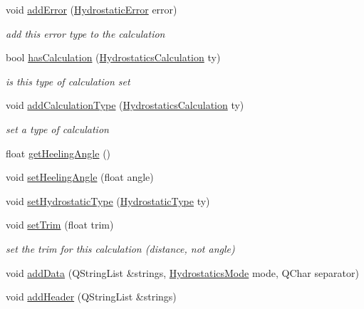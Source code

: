 \begin{DoxyCompactItemize}
void \hyperlink{classShipCAD_1_1HydrostaticCalc_a7c42f2e85cca01401ece2684903b7fbd}{add\-Error} (\hyperlink{namespaceShipCAD_a48b5202490cd6d86939d57c867837c0f}{Hydrostatic\-Error} error)
\begin{DoxyCompactList}\small\item\em add this error type to the calculation \end{DoxyCompactList}\item 
bool \hyperlink{classShipCAD_1_1HydrostaticCalc_aabd9daccfec478a2babfab8792ab3ac3}{has\-Calculation} (\hyperlink{namespaceShipCAD_a0612ca68b6918148a0d9871184264f93}{Hydrostatics\-Calculation} ty)
\begin{DoxyCompactList}\small\item\em is this type of calculation set \end{DoxyCompactList}\item 
void \hyperlink{classShipCAD_1_1HydrostaticCalc_adcd0de12b0a4a045c062c788ce0fc534}{add\-Calculation\-Type} (\hyperlink{namespaceShipCAD_a0612ca68b6918148a0d9871184264f93}{Hydrostatics\-Calculation} ty)
\begin{DoxyCompactList}\small\item\em set a type of calculation \end{DoxyCompactList}\item 
float \hyperlink{classShipCAD_1_1HydrostaticCalc_ac82abf7bbe837140a831d782d89c7c56}{get\-Heeling\-Angle} ()
\item 
void \hyperlink{classShipCAD_1_1HydrostaticCalc_ae6bf118e2e5e89a8e8d7ea7675fdee22}{set\-Heeling\-Angle} (float angle)
\item 
void \hyperlink{classShipCAD_1_1HydrostaticCalc_ab1b677a71d5f37f3fbbbacf3f27c7f43}{set\-Hydrostatic\-Type} (\hyperlink{namespaceShipCAD_af34462de5db0247c80b656785e989233}{Hydrostatic\-Type} ty)
\item 
void \hyperlink{classShipCAD_1_1HydrostaticCalc_ace579596fa77d8e3ea4f854ca033ed83}{set\-Trim} (float trim)
\begin{DoxyCompactList}\small\item\em set the trim for this calculation (distance, not angle) \end{DoxyCompactList}\item 
void \hyperlink{classShipCAD_1_1HydrostaticCalc_a37baaf9ea5104a689db1ee395350424f}{add\-Data} (Q\-String\-List \&strings, \hyperlink{namespaceShipCAD_a1d3d04d35d63e8a5e44c63183f79200a}{Hydrostatics\-Mode} mode, Q\-Char separator)
\item 
void \hyperlink{classShipCAD_1_1HydrostaticCalc_a95e0e1aa5d11f49cb0f0553ba45af085}{add\-Header} (Q\-String\-List \&strings)

\end{DoxyCompactItemize}
